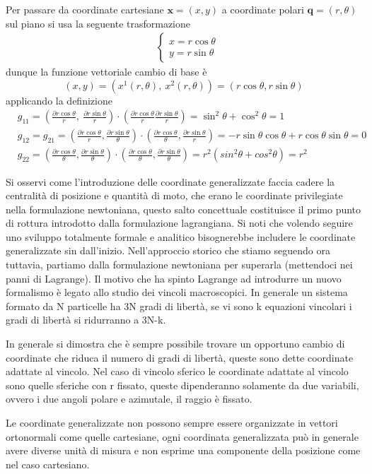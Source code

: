 \documentclass[
10pt, %
a4paper, %
oneside, %
headinclude,footinclude, %
BCOR5mm, %
]{scrartcl}
\begin{document}
\begin{esempio}
	Per passare da coordinate cartesiane \(\mathbf{x} = (x, y)\) a coordinate polari \(\mathbf{q} = (r, \theta)\) sul piano si usa la seguente trasformazione
	\begin{align*}
		&\begin{cases}
			x = r\cos\theta\\
			y = r\sin\theta
		\end{cases}
	\end{align*}
	dunque la funzione vettoriale cambio di base è
	\[(x, y) = (x^1(r, \theta),\ x^2(r, \theta)) = (r\cos\theta, r\sin\theta)\]
	applicando la definizione
	\begin{align*}
		&g_{11} = (\frac{\partial r\cos\theta}{r},\ \frac{\partial r\sin\theta}{r})\cdot(\frac{\partial r\cos\theta}{r} \frac{\partial r\sin\theta}{r}) = \sin^2\theta+\cos^2\theta = 1\\
		&g_{12} = g_{21} =  (\frac{\partial r\cos\theta}{r}, \frac{\partial r\sin\theta}{\theta})\cdot(\frac{\partial r\cos\theta}{\theta}, \frac{\partial r\sin\theta}{r})= -r\sin\theta\cos\theta+r\cos\theta\sin\theta = 0 \\
		&g_{22} =  (\frac{\partial r\cos\theta}{\theta}, \frac{\partial r\sin\theta}{\theta})\cdot(\frac{\partial r\cos\theta}{\theta}, \frac{\partial r\sin\theta}{\theta}) =  r^2(sin^2\theta+cos^2\theta)= r^2
	\end{align*}
\end{esempio}
Si osservi come l'introduzione delle coordinate generalizzate faccia cadere la centralità di posizione e quantità di moto, che erano le coordinate privilegiate nella formulazione newtoniana, questo salto concettuale costituisce il primo punto di rottura introdotto dalla formulazione lagrangiana. Si noti che volendo seguire uno sviluppo totalmente formale e analitico bisognerebbe includere le coordinate generalizzate sin dall'inizio. Nell'approccio storico che stiamo seguendo ora tuttavia, partiamo dalla formulazione newtoniana per superarla (mettendoci nei panni di Lagrange). Il motivo che ha spinto Lagrange ad introdurre un nuovo formalismo è legato allo studio dei vincoli macroscopici. In generale un sistema formato da N particelle ha 3N gradi di libertà, se vi sono k equazioni vincolari i gradi di libertà si ridurranno a 3N-k.
\begin{esempio}
	In generale si dimostra che è sempre possibile trovare un opportuno cambio di coordinate che riduca il numero di gradi di libertà, queste sono dette coordinate adattate al vincolo.	Nel caso di vincolo sferico le coordinate adattate al vincolo sono quelle sferiche con r fissato, queste dipenderanno solamente da due variabili, ovvero i due angoli polare e azimutale, il raggio è fissato.
\end{esempio}
\begin{osservazione}
	Le coordinate generalizzate non possono sempre essere organizzate in vettori ortonormali come quelle cartesiane, ogni coordinata generalizzata può in generale avere diverse unità di misura e non esprime una componente della posizione come nel caso cartesiano.
\end{osservazione}
\end{document}
